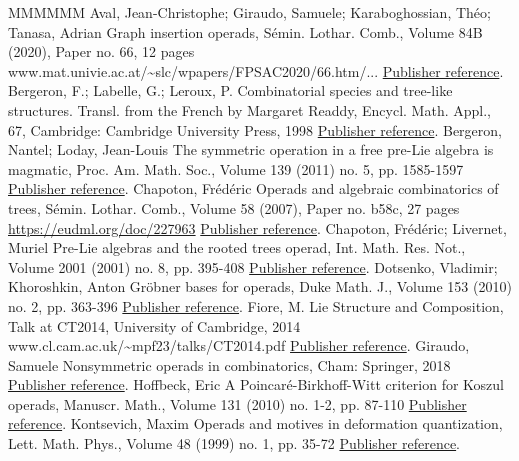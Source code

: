 \begin{thebibliography}{MMMMMM}
 Aval, Jean-Christophe; Giraudo, Samuele; Karaboghossian, Théo; Tanasa, Adrian Graph insertion operads, Sémin. Lothar. Comb., Volume 84B (2020), Paper no. 66, 12 pages www.mat.univie.ac.at/\textasciitilde{}slc/wpapers/FPSAC2020/66.htm/... \href{https://alco.centre-mersenne.org/articles/10.5802/alco.442/#AGKT20}{Publisher reference}.
 Bergeron, F.; Labelle, G.; Leroux, P. Combinatorial species and tree-like structures. Transl. from the French by Margaret Readdy, Encycl. Math. Appl., 67, Cambridge: Cambridge University Press, 1998 \href{https://alco.centre-mersenne.org/articles/10.5802/alco.442/#BLL98}{Publisher reference}.
 Bergeron, Nantel; Loday, Jean-Louis The symmetric operation in a free pre-Lie algebra is magmatic, Proc. Am. Math. Soc., Volume 139 (2011) no. 5, pp. 1585-1597 \href{https://alco.centre-mersenne.org/articles/10.5802/alco.442/#BL11}{Publisher reference}.
 Chapoton, Frédéric Operads and algebraic combinatorics of trees, Sémin. Lothar. Comb., Volume 58 (2007), Paper no. b58c, 27 pages \url{https://eudml.org/doc/227963} \href{https://alco.centre-mersenne.org/articles/10.5802/alco.442/#CSLC}{Publisher reference}.
 Chapoton, Frédéric; Livernet, Muriel Pre-Lie algebras and the rooted trees operad, Int. Math. Res. Not., Volume 2001 (2001) no. 8, pp. 395-408 \href{https://alco.centre-mersenne.org/articles/10.5802/alco.442/#CL01}{Publisher reference}.
 Dotsenko, Vladimir; Khoroshkin, Anton Gröbner bases for operads, Duke Math. J., Volume 153 (2010) no. 2, pp. 363-396 \href{https://alco.centre-mersenne.org/articles/10.5802/alco.442/#DK10}{Publisher reference}.
 Fiore, M. Lie Structure and Composition, Talk at CT2014, University of Cambridge, 2014 www.cl.cam.ac.uk/\textasciitilde{}mpf23/talks/CT2014.pdf \href{https://alco.centre-mersenne.org/articles/10.5802/alco.442/#F14}{Publisher reference}.
 Giraudo, Samuele Nonsymmetric operads in combinatorics, Cham: Springer, 2018 \href{https://alco.centre-mersenne.org/articles/10.5802/alco.442/#Gir18}{Publisher reference}.
 Hoffbeck, Eric A Poincaré-Birkhoff-Witt criterion for Koszul operads, Manuscr. Math., Volume 131 (2010) no. 1-2, pp. 87-110 \href{https://alco.centre-mersenne.org/articles/10.5802/alco.442/#Hof10}{Publisher reference}.
 Kontsevich, Maxim Operads and motives in deformation quantization, Lett. Math. Phys., Volume 48 (1999) no. 1, pp. 35-72 \href{https://alco.centre-mersenne.org/articles/10.5802/alco.442/#Kon99}{Publisher reference}.

\end{thebibliography}
